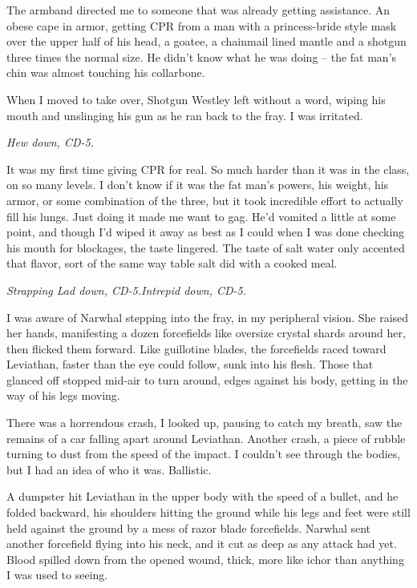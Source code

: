 The armband directed me to someone that was already getting assistance.  An obese cape in armor, getting CPR from a man with a princess-bride style mask over the upper half of his head, a goatee, a chainmail lined mantle and a shotgun three times the normal size.  He didn't know what he was doing – the fat man's chin was almost touching his collarbone.



When I moved to take over, Shotgun Westley left without a word, wiping his mouth and unslinging his gun as he ran back to the fray.  I was irritated.



\emph{Hew down, CD-5.}



It was my first time giving CPR for real.  So much harder than it was in the class, on so many levels.  I don't know if it was the fat man's powers, his weight, his armor, or some combination of the three, but it took incredible effort to actually fill his lungs.  Just doing it made me want to gag.  He'd vomited a little at some point, and though I'd wiped it away as best as I could when I was done checking his mouth for blockages, the taste lingered.  The taste of salt water only accented that flavor, sort of the same way table salt did with a cooked meal.



\emph{Strapping Lad down, CD-5.}\emph{Intrepid down, CD-5.}



I was aware of Narwhal stepping into the fray, in my peripheral vision.  She raised her hands, manifesting a dozen forcefields like oversize crystal shards around her, then flicked them forward.  Like guillotine blades, the forcefields raced toward Leviathan, faster than the eye could follow, sunk into his flesh.  Those that glanced off stopped mid-air to turn around, edges against his body, getting in the way of his legs moving.



There was a horrendous crash, I looked up, pausing to catch my breath, saw the remains of a car falling apart around Leviathan.  Another crash, a piece of rubble turning to dust from the speed of the impact.  I couldn't see through the bodies, but I had an idea of who it was.  Ballistic.



A dumpster hit Leviathan in the upper body with the speed of a bullet, and he folded backward, his shoulders hitting the ground while his legs and feet were still held against the ground by a mess of razor blade forcefields.  Narwhal sent another forcefield flying into his neck, and it cut as deep as any attack had yet.  Blood spilled down from the opened wound, thick, more like ichor than anything I was used to seeing.



